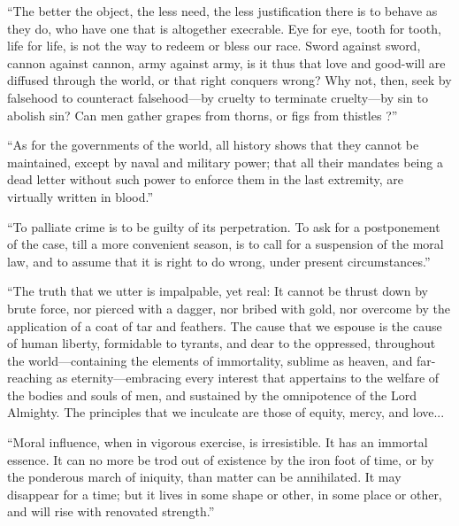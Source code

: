 \documentclass{book}
\begin{document}
“The better the object, the less need, the less justification there is to behave as they do, who have one that is altogether execrable. Eye for eye, tooth for tooth, life for life, is not the way to redeem or bless our race. Sword against sword, cannon against cannon, army against army, is it thus that love and good-will are diffused through the world, or that right conquers wrong? Why not, then, seek by falsehood to counteract falsehood—by cruelty to terminate cruelty—by sin to abolish sin? Can men gather grapes from thorns, or figs from thistles ?”\footnotemark[13]

“As for the governments of the world, all history shows that they cannot be maintained, except by naval and military power; that all their mandates being a dead letter without such power to enforce them in the last extremity, are virtually written in blood.”\footnotemark[14]

“To palliate crime is to be guilty of its perpetration. To ask for a postponement of the case, till a more convenient season, is to call for a suspension of the moral law, and to assume that it is right to do wrong, under present circumstances.”\footnotemark[15]

“The truth that we utter is impalpable, yet real: It cannot be thrust down by brute force, nor pierced with a dagger, nor bribed with gold, nor overcome by the application of a coat of tar and feathers. The cause that we espouse is the cause of human liberty, formidable to tyrants, and dear to the oppressed, throughout the world—containing the elements of immortality, sublime as heaven, and far-reaching as eternity—embracing every interest that appertains to the welfare of the bodies and souls of men, and sustained by the omnipotence of the Lord Almighty. The principles that we inculcate are those of equity, mercy, and love...\footnotemark[16]

“Moral influence, when in vigorous exercise, is irresistible. It has an immortal essence. It can no more be trod out of existence by the iron foot of time, or by the ponderous march of iniquity, than matter can be annihilated. It may disappear for a time; but it lives in some shape or other, in some place or other, and will rise with renovated strength.”\footnotemark[17]
\end{document}
